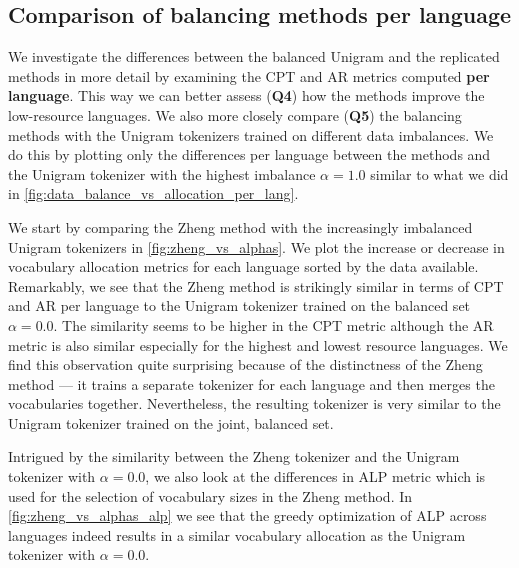\subsection{Comparison of balancing methods per language}
\label{sec:comparison_balancing_methods_per_lang}

We investigate the differences between the balanced Unigram and the replicated methods in more detail by examining the CPT and AR metrics computed \textbf{per language}. This way we can better assess (\textbf{Q4}) how the methods improve the low-resource languages. We also more closely compare (\textbf{Q5}) the balancing methods with the Unigram tokenizers trained on different data imbalances. We do this by plotting only the differences per language between the methods and the Unigram tokenizer with the highest imbalance $\alpha=1.0$ similar to what we did in \autoref{fig:data_balance_vs_allocation_per_lang}.

We start by comparing the Zheng method with the increasingly imbalanced Unigram tokenizers in \autoref{fig:zheng_vs_alphas}. We plot the increase or decrease in vocabulary allocation metrics for each language sorted by the data available. Remarkably, we see that the Zheng method is strikingly similar in terms of CPT and AR per language to the Unigram tokenizer trained on the balanced set $\alpha=0.0$. The similarity seems to be higher in the CPT metric although the AR metric is also similar especially for the highest and lowest resource languages. We find this observation quite surprising because of the distinctness of the Zheng method --- it trains a separate tokenizer for each language and then merges the vocabularies together. Nevertheless, the resulting tokenizer is very similar to the Unigram tokenizer trained on the joint, balanced set. 

Intrigued by the similarity between the Zheng tokenizer and the Unigram tokenizer with $\alpha=0.0$, we also look at the differences in ALP metric which is used for the selection of vocabulary sizes in the Zheng method. In \autoref{fig:zheng_vs_alphas_alp} we see that the greedy optimization of ALP across languages indeed results in a similar vocabulary allocation as the Unigram tokenizer with $\alpha=0.0$.


